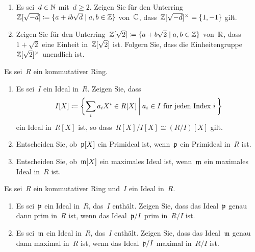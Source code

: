 \documentclass{scrartcl}
\begin{document}
\begin{exercise}
  \leavevmode
  \begin{enumerate}
    \item
      Es sei~$d \in \mathbb{N}$ mit~$d \geq 2$.
      Zeigen Sie für den Unterring~$\Integer[\sqrt{-d}] \defined \{ a + i b \sqrt{d} \suchthat a, b \in \Integer \}$ von~$\mathbb{C}$, dass~$\mathbb{Z}[\sqrt{-d}]^\times = \{1, -1\}$ gilt.
    \item
      Zeigen Sie für den Unterring~$\Integer[\sqrt{2}] \defined \{ a + b \sqrt{2} \suchthat a, b \in \Integer \}$ von~$\mathbb{R}$, dass~$1 + \sqrt{2}$ eine Einheit in~$\mathbb{Z}[\sqrt{2}]$ ist.
      Folgern Sie, dass die Einheitengruppe~$\mathbb{Z}[\sqrt{2}]^\times$ unendlich ist.
  \end{enumerate}
\end{exercise}

\begin{exercise}
  Es sei~$R$ ein kommutativer Ring.
  \begin{enumerate}
    \item
      Es sei~$I$ ein Ideal in~$R$.
      Zeigen Sie, dass
      \[
        I[X]
        \defined
        \biggl\{
          \sum_i a_i X^i \in R[X]
        \suchthat[\bigg]
          \text{$a_i \in I$ für jeden Index~$i$}
          \spacing
        \biggr\}
      \]
      ein Ideal in~$R[X]$ ist, so dass~$R[X] / I[X] \cong (R/I)[X]$ gilt.
    \item
      Entscheiden Sie, ob~$\mathfrak{p}[X]$ ein Primideal ist, wenn~$\mathfrak{p}$ ein Primideal in~$R$ ist.
    \item
      Entscheiden Sie, ob~$\mathfrak{m}[X]$ ein maximales Ideal ist, wenn~$\mathfrak{m}$ ein maximales Ideal in~$R$ ist.
  \end{enumerate}
\end{exercise}

\begin{exercise}
  Es sei~$R$ ein kommutativer Ring und~$I$ ein Ideal in~$R$.
  \begin{enumerate}
    \item
      Es sei~$\mathfrak{p}$ ein Ideal in~$R$, das~$I$ enthält.
      Zeigen Sie, dass das Ideal~$\mathfrak{p}$ genau dann prim in~$R$ ist, wenn das Ideal~$\mathfrak{p}/I$ prim in~$R/I$ ist.
    \item
      Es sei~$\mathfrak{m}$ ein Ideal in~$R$, das~$I$ enthält.
      Zeigen Sie, dass das Ideal~$\mathfrak{m}$ genau dann maximal in~$R$ ist, wenn das Ideal~$\mathfrak{p}/I$ maximal in~$R/I$ ist.
  \end{enumerate}
\end{exercise}
\end{document}
